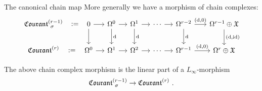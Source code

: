 \documentclass[beamer,10pt]{standalone}
\begin{document}
\begin{frame}{The canonical chain map}
	More generally we have a morphism of chain complexes:
	\begin{displaymath}
		\begin{tikzcd}[ampersand replacement=\&,column sep = small]
			\Courant[\sigma]{r-1} \ar[r,phantom,":="] %
			\&[1em]
			0 \ar[r] \ar[d]
			\& \Omega^0 \ar[d,"\d"] \ar[r]
			\& \Omega^1 \ar[d,"\d"] \ar[r]
			\& \cdots \ar[r]
			\& \Omega^{r-2} \ar[d,"\d"] \ar[r,"{(\d,0)}"]
			\&[.5em]  \Omega^{r-1} \oplus \X \ar[d,"{(\d,\id)}"]
			\\
			\Courant{r} \ar[r,phantom,":="]
			\& \Omega^0 \ar[r]
			\& \Omega^1 \ar[r]
			\& \Omega^2 \ar[r]
			\& \cdots \ar[r]
			\& \Omega^{r-1} \ar[r,"{(\d,0)}"]
			\&\Omega^{r} \oplus \X
		\end{tikzcd}
	\end{displaymath}

	\vfill\pause

	\begin{thmblock}
		The above chain complex morphism is the linear part of a $L_\infty$-morphism $$\Courant[\sigma]{r-1} \to \Courant{r}~.$$
	\end{thmblock}

	\vfill
\end{frame}
\end{document}
